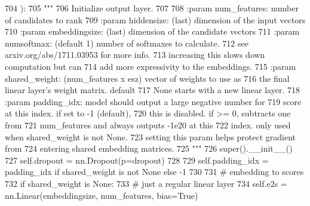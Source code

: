 \begin{DoxyCode}
704     ):
705         \textcolor{stringliteral}{"""}
706 \textcolor{stringliteral}{        Initialize output layer.}
707 \textcolor{stringliteral}{}
708 \textcolor{stringliteral}{        :param num\_features:  number of candidates to rank}
709 \textcolor{stringliteral}{        :param hiddensize:    (last) dimension of the input vectors}
710 \textcolor{stringliteral}{        :param embeddingsize: (last) dimension of the candidate vectors}
711 \textcolor{stringliteral}{        :param numsoftmax:   (default 1) number of softmaxes to calculate.}
712 \textcolor{stringliteral}{                              see arxiv.org/abs/1711.03953 for more info.}
713 \textcolor{stringliteral}{                              increasing this slows down computation but can}
714 \textcolor{stringliteral}{                              add more expressivity to the embeddings.}
715 \textcolor{stringliteral}{        :param shared\_weight: (num\_features x esz) vector of weights to use as}
716 \textcolor{stringliteral}{                              the final linear layer's weight matrix. default}
717 \textcolor{stringliteral}{                              None starts with a new linear layer.}
718 \textcolor{stringliteral}{        :param padding\_idx:   model should output a large negative number for}
719 \textcolor{stringliteral}{                              score at this index. if set to -1 (default),}
720 \textcolor{stringliteral}{                              this is disabled. if >= 0, subtracts one from}
721 \textcolor{stringliteral}{                              num\_features and always outputs -1e20 at this}
722 \textcolor{stringliteral}{                              index. only used when shared\_weight is not None.}
723 \textcolor{stringliteral}{                              setting this param helps protect gradient from}
724 \textcolor{stringliteral}{                              entering shared embedding matrices.}
725 \textcolor{stringliteral}{        """}
726         super().\_\_init\_\_()
727         self.dropout = nn.Dropout(p=dropout)
728 
729         self.padding\_idx = padding\_idx \textcolor{keywordflow}{if} shared\_weight \textcolor{keywordflow}{is} \textcolor{keywordflow}{not} \textcolor{keywordtype}{None} \textcolor{keywordflow}{else} -1
730 
731         \textcolor{comment}{# embedding to scores}
732         \textcolor{keywordflow}{if} shared\_weight \textcolor{keywordflow}{is} \textcolor{keywordtype}{None}:
733             \textcolor{comment}{# just a regular linear layer}
734             self.e2s = nn.Linear(embeddingsize, num\_features, bias=\textcolor{keyword}{True})

\end{DoxyCode}
